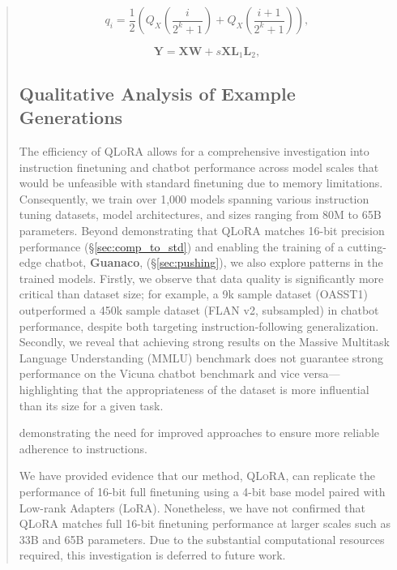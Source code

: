 \begin{quote}
\begin{equation}
q_i  = \frac{1}{2}\left( Q_X\left(\frac{i}{2^k+1}\right) + Q_X\left(\frac{i+1}{2^k+1}\right)\right),
\end{equation}

\begin{equation}
    \mathbf{Y} = \mathbf{X}\mathbf{W} + s\mathbf{X}\mathbf{L}_1\mathbf{L}_2,
\end{equation}

\subsection{Qualitative Analysis of Example Generations}
\label{ssec:examples}

The efficiency of \textsc{QLoRA} allows for a comprehensive investigation into instruction finetuning and chatbot performance across model scales that would be unfeasible with standard finetuning due to memory limitations. Consequently, we train over 1,000 models spanning various instruction tuning datasets, model architectures, and sizes ranging from 80M to 65B parameters. Beyond demonstrating that \textsc{QLoRA} matches 16-bit precision performance (\S\ref{sec:comp_to_std}) and enabling the training of a cutting-edge chatbot, \textbf{Guanaco}, (\S\ref{sec:pushing}), we also explore patterns in the trained models. Firstly, we observe that data quality is significantly more critical than dataset size; for example, a 9k sample dataset (OASST1) outperformed a 450k sample dataset (FLAN v2, subsampled) in chatbot performance, despite both targeting instruction-following generalization. Secondly, we reveal that achieving strong results on the Massive Multitask Language Understanding (MMLU) benchmark does not guarantee strong performance on the Vicuna chatbot benchmark and vice versa—highlighting that the appropriateness of the dataset is more influential than its size for a given task.

demonstrating the need for improved approaches to ensure more reliable adherence to instructions.

We have provided evidence that our method, \textsc{QLoRA}, can replicate the performance of 16-bit full finetuning using a 4-bit base model paired with Low-rank Adapters (LoRA). Nonetheless, we have not confirmed that \textsc{QLoRA} matches full 16-bit finetuning performance at larger scales such as 33B and 65B parameters. Due to the substantial computational resources required, this investigation is deferred to future work.


\end{quote}
